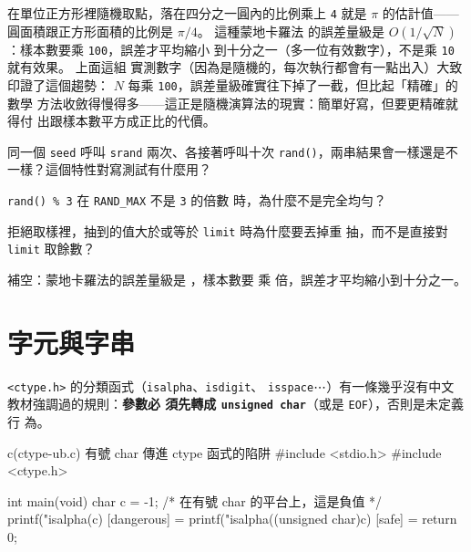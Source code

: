 在單位正方形裡隨機取點，落在四分之一圓內的比例乘上 \texttt{4} 就是
$\pi$ 的估計值——圓面積跟正方形面積的比例是 $\pi/4$。 這種蒙地卡羅法
的誤差量級是 $O(1/\sqrt{N})$：樣本數要乘 \texttt{100}，誤差才平均縮小
到十分之一（多一位有效數字），不是乘 \texttt{10} 就有效果。 上面這組
實測數字（因為是隨機的，每次執行都會有一點出入）大致印證了這個趨勢：
$N$ 每乘 \texttt{100}，誤差量級確實往下掉了一截，但比起「精確」的數學
方法收斂得慢得多——這正是隨機演算法的現實：簡單好寫，但要更精確就得付
出跟樣本數平方成正比的代價。


\begin{drills}[label=drills:sl-rand]
\item 同一個 \texttt{seed} 呼叫 \texttt{srand} 兩次、各接著呼叫十次
\texttt{rand()}，兩串結果會一樣還是不一樣？這個特性對寫測試有什麼用？
\item \texttt{rand() \% 3} 在 \texttt{RAND\_MAX} 不是 \texttt{3} 的倍數
時，為什麼不是完全均勻？
\item 拒絕取樣裡，抽到的值大於或等於 \texttt{limit} 時為什麼要丟掉重
抽，而不是直接對 \texttt{limit} 取餘數？
\item 補空：蒙地卡羅法的誤差量級是 \underline{\hspace{2em}}，樣本數要
乘 \underline{\hspace{2em}} 倍，誤差才平均縮小到十分之一。
\end{drills}

\section{字元與字串}
\label{sec:sl-charstring}

\texttt{<ctype.h>} 的分類函式（\texttt{isalpha}、\texttt{isdigit}、
\texttt{isspace}⋯）有一條幾乎沒有中文教材強調過的規則：\textbf{參數必
須先轉成 \texttt{unsigned char}}（或是 \texttt{EOF}），否則是未定義行
為。

\begin{example}{c}{(ctype-ub.c) 有號 char 傳進 ctype 函式的陷阱}
#include <stdio.h>
#include <ctype.h>

int main(void) {
    char c = -1; /* 在有號 char 的平台上，這是負值 */
    printf("isalpha(c) [dangerous] = %
    printf("isalpha((unsigned char)c) [safe] = %
    return 0;
}
\end{example}

